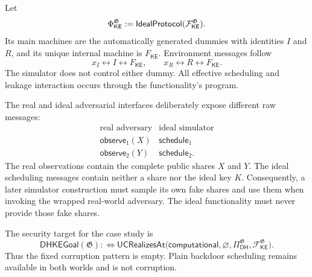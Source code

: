 \begin{definition}
\label{def:dhke-ideal-protocol}
\notready
Let
\[
  \Phi_{\mathsf{KE}}^{\mathfrak G}
  :=\mathsf{IdealProtocol}(\mathcal F_{\mathsf{KE}}^{\mathfrak G}).
\]
Its main machines are the automatically generated dummies with identities
\(I\) and \(R\), and its unique internal machine is
\(F_{\mathsf{KE}}\).  Environment messages follow
\[
  x_I\leftrightarrow I\leftrightarrow F_{\mathsf{KE}},
  \qquad
  x_R\leftrightarrow R\leftrightarrow F_{\mathsf{KE}}.
\]
The simulator does not control either dummy.  All effective scheduling and
leakage interaction occurs through the functionality's program.
\end{definition}

\begin{definition}
\label{def:dhke-observation-boundary}
\notready
The real and ideal adversarial interfaces deliberately expose different raw
messages:
\[
\begin{array}{c|c}
  \text{real adversary} & \text{ideal simulator}\\ \hline
  \mathsf{observe}_1(X) & \mathsf{schedule}_1\\
  \mathsf{observe}_2(Y) & \mathsf{schedule}_2.
\end{array}
\]
The real observations contain the complete public shares \(X\) and \(Y\).
The ideal scheduling messages contain neither a share nor the ideal key
\(K\).  Consequently, a later simulator construction must sample its own fake
shares and use them when invoking the wrapped real-world adversary.  The ideal
functionality must never provide those fake shares.
\end{definition}

\begin{definition}
\label{def:dhke-uc-target}
\notready
The security target for the case study is
\[
  \mathsf{DHKEGoal}(\mathfrak G)
  :\Longleftrightarrow
  \mathsf{UCRealizesAt}
  \bigl(
    \mathsf{computational},
    \varnothing,
    \Pi_{\mathsf{DH}}^{\mathfrak G},
    \mathcal F_{\mathsf{KE}}^{\mathfrak G}
  \bigr).
\]
Thus the fixed corruption pattern is empty.  Plain backdoor scheduling remains
available in both worlds and is not corruption.
\end{definition}

